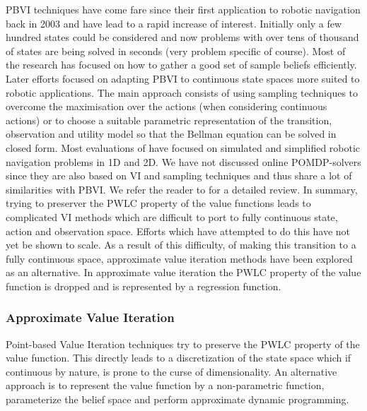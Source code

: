 PBVI techniques have come fare since their first application to robotic navigation back in 2003 and have lead to a rapid increase of interest. 
Initially only a few hundred states could be considered and now problems with over tens of thousand of states are being solved in seconds (very problem specific of course). 
Most of the research has focused on how to gather a good set of sample beliefs efficiently. Later efforts focused on adapting PBVI 
to continuous state spaces more suited to robotic applications. The main approach consists of using sampling techniques to overcome 
the maximisation over the actions (when considering continuous actions) or to choose a suitable parametric representation of the transition, observation 
and utility model so that the Bellman equation can be solved in closed form. Most evaluations of have focused on simulated and simplified robotic 
navigation problems in 1D and 2D. We have not discussed online POMDP-solvers since they are also based on VI and sampling techniques and thus share 
a lot of similarities with PBVI. We refer the reader to \cite{Ross08onlineplanning} for a detailed review. In summary, trying to preserver the PWLC property 
of the value functions leads to complicated VI methods which are difficult to port to fully continuous state, action and observation space. Efforts which 
have attempted to do this have not yet be shown to scale. As a result of this difficulty, of making this transition to a fully continuous space, approximate value 
iteration methods have been explored as an alternative. In approximate value iteration the PWLC property of the value function is dropped and is 
represented by a regression function.


\subsubsection{Approximate Value Iteration}

Point-based Value Iteration techniques try to preserve the PWLC property of the value function. This directly 
leads to a discretization of the state space which if continuous by nature, is prone to the curse of dimensionality.
An alternative approach is to represent the value function by a non-parametric function, parameterize the belief space and perform approximate 
dynamic programming.  


